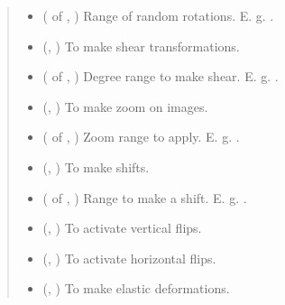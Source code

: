 \documentclass[letterpaper,10pt,english]{sphinxmanual}
\begin{document}
\begin{fulllineitems}
\begin{quote}
\begin{description}
\begin{itemize}
\item {} 
 ( of , ) \textendash{} Range of random rotations. E. g. .

\item {} 
 (, ) \textendash{} To make shear transformations.

\item {} 
 ( of , ) \textendash{} Degree range to make shear. E. g. .

\item {} 
 (, ) \textendash{} To make zoom on images.

\item {} 
 ( of , ) \textendash{} Zoom range to apply. E. g. .

\item {} 
 (, ) \textendash{} To make shifts.

\item {} 
 ( of , ) \textendash{} Range to make a shift. E. g. .

\item {} 
 (, ) \textendash{} To activate vertical flips.

\item {} 
 (, ) \textendash{} To activate horizontal flips.

\item {} 
 (, ) \textendash{} To make elastic deformations.


\end{itemize}
\end{description}
\end{quote}
\end{fulllineitems}
\end{document}
